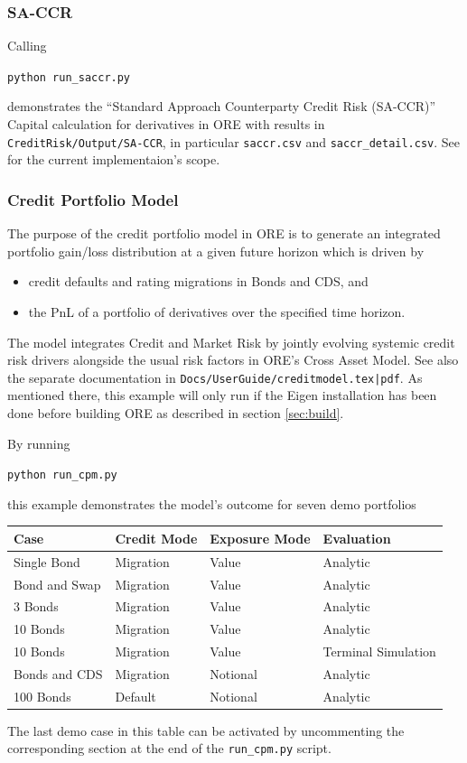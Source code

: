 \subsubsection{SA-CCR}\label{example:creditrisk_saccr}

Calling
\medskip
\centerline {\tt python run\_saccr.py} 

\medskip
demonstrates the ``Standard Approach Counterparty Credit Risk (SA-CCR)'' Capital calculation for
derivatives in ORE with results in {\tt CreditRisk/Output/SA-CCR}, in particular {\tt saccr.csv}
and {\tt saccr\_detail.csv}. See \cite{methods} for the current implementaion's scope. 

\subsubsection{Credit Portfolio Model}\label{example:creditrisk_cpm}

The purpose of the credit portfolio model in ORE is to generate an integrated portfolio gain/loss distribution
at a given future horizon which is driven by 
\begin{itemize}
\item credit defaults and rating migrations in Bonds and CDS, and 
\item the PnL of a portfolio of derivatives over the specified time horizon.
\end{itemize}
The model integrates Credit and Market Risk by jointly evolving systemic credit risk drivers
alongside the usual risk factors in ORE's Cross Asset Model.
See also the separate documentation in {\tt Docs/UserGuide/creditmodel.tex|pdf}.
As mentioned there, this example will only run if the Eigen installation has been done before building ORE as described in section \ref{sec:build}.

By running \\
\medskip
\centerline{{\tt python run\_cpm.py}} 

\medskip
this example demonstrates the model's outcome for seven demo portfolios

\begin{center}
\begin{tabular}{|l|l|l|l|}
\hline
Case & Credit Mode & Exposure Mode & Evaluation \\
\hline
\hline
Single Bond & Migration & Value & Analytic \\
\hline
Bond and Swap & Migration & Value & Analytic \\
\hline
3 Bonds & Migration & Value & Analytic \\
\hline
10 Bonds & Migration & Value & Analytic \\
\hline
10 Bonds & Migration & Value & Terminal Simulation \\
\hline
Bonds and CDS & Migration & Notional & Analytic \\
\hline
100 Bonds & Default & Notional & Analytic \\
\hline
\end{tabular}
\end{center}
The last demo case in this table can be activated by uncommenting the corresponding section at the end of the {\tt run\_cpm.py}
script.


